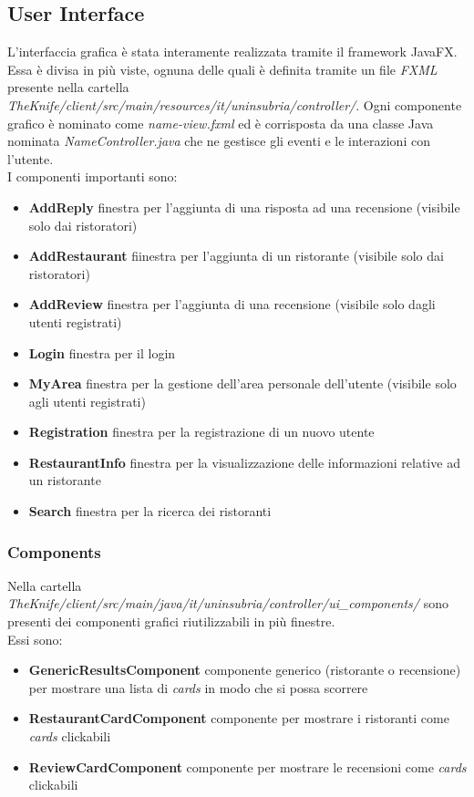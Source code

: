 \subsection{User Interface}
L'interfaccia grafica è stata interamente realizzata tramite 
il framework JavaFX.
Essa è divisa in più viste, ognuna delle quali è definita 
tramite un file \textit{FXML} presente nella cartella 
\textit{TheKnife/client/src/main/resources/it/uninsubria/controller/}.
Ogni componente grafico è nominato come \textit{name-view.fxml} ed 
è corrisposta da una classe Java nominata \textit{NameController.java}
che ne gestisce gli eventi e le interazioni con l'utente.\\
I componenti importanti sono:
\begin{itemize}
    \item  \textbf{AddReply} finestra per l'aggiunta di una risposta ad una recensione (visibile solo dai ristoratori)
    \item  \textbf{AddRestaurant} fiinestra per l'aggiunta di un ristorante (visibile solo dai ristoratori)
    \item  \textbf{AddReview} finestra per l'aggiunta di una recensione (visibile solo dagli utenti registrati)
    \item  \textbf{Login} finestra per il login
    \item  \textbf{MyArea} finestra per la gestione dell'area personale dell'utente (visibile solo agli utenti registrati)
    \item  \textbf{Registration} finestra per la registrazione di un nuovo utente
    \item  \textbf{RestaurantInfo} finestra per la visualizzazione delle informazioni relative ad un ristorante
    \item  \textbf{Search} finestra per la ricerca dei ristoranti
\end{itemize}

\subsubsection{Components}
Nella cartella 
\textit{TheKnife/client/src/main/java/it/uninsubria/controller/ui\_components/}
sono presenti dei componenti grafici riutilizzabili in più finestre.\\
Essi sono:
\begin{itemize}
    \item \textbf{GenericResultsComponent} componente generico (ristorante o recensione) per mostrare una lista di \textit{cards} in modo che si possa scorrere
    \item \textbf{RestaurantCardComponent} componente per mostrare i ristoranti come \textit{cards} clickabili
    \item \textbf{ReviewCardComponent} componente per mostrare le recensioni come \textit{cards} clickabili
\end{itemize}

